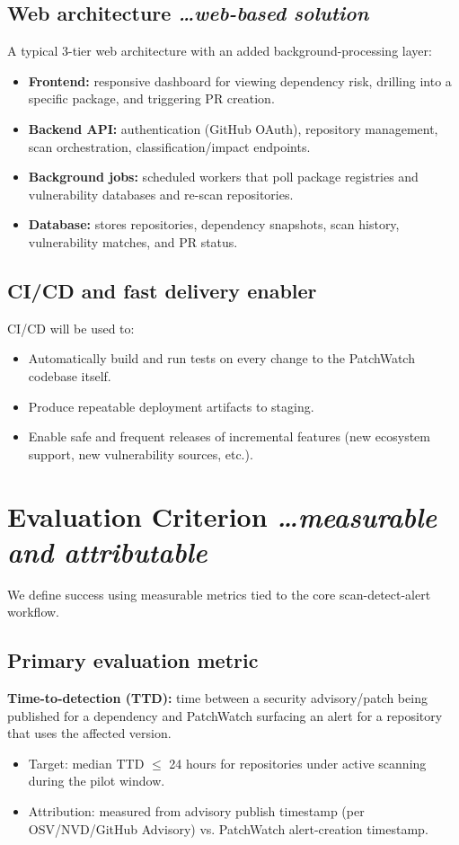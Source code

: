 \documentclass[11pt,a4paper]{article}
\newcommand{\BvrHint}[1]{%
  {\normalfont\normalsize\itshape\hfill #1}}
\begin{document}
\subsection{Web architecture %
\BvrHint{\ldots web-based solution}}
A typical 3-tier web architecture with an added background-processing layer:
\begin{itemize}[leftmargin=0.7cm]
    \item \textbf{Frontend:} responsive dashboard for viewing dependency risk, drilling into a specific package, and triggering PR creation.
    \item \textbf{Backend API:} authentication (GitHub OAuth), repository management, scan orchestration, classification/impact endpoints.
    \item \textbf{Background jobs:} scheduled workers that poll package registries and vulnerability databases and re-scan repositories.
    \item \textbf{Database:} stores repositories, dependency snapshots, scan history, vulnerability matches, and PR status.
\end{itemize}

\subsection{CI/CD and fast delivery enabler}
CI/CD will be used to:
\begin{itemize}[leftmargin=0.7cm]
    \item Automatically build and run tests on every change to the PatchWatch codebase itself.
    \item Produce repeatable deployment artifacts to staging.
    \item Enable safe and frequent releases of incremental features (new ecosystem support, new vulnerability sources, etc.).
\end{itemize}

\section{Evaluation Criterion %
\BvrHint{\ldots measurable and attributable}}
We define success using measurable metrics tied to the core scan-detect-alert workflow.

\subsection{Primary evaluation metric}
\textbf{Time-to-detection (TTD):} time between a security advisory/patch being published for a dependency and PatchWatch surfacing an alert for a repository that uses the affected version.
\begin{itemize}[leftmargin=0.7cm]
    \item Target: median TTD $\le$ 24 hours for repositories under active scanning during the pilot window.
    \item Attribution: measured from advisory publish timestamp (per OSV/NVD/GitHub Advisory) vs. PatchWatch alert-creation timestamp.
\end{itemize}
\end{document}
